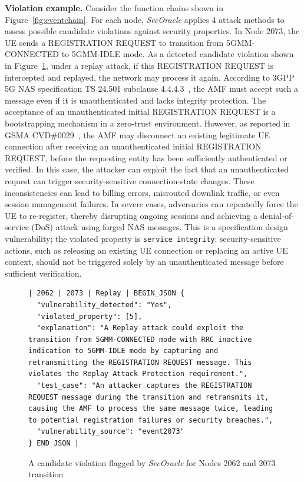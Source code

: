 \documentclass[sigconf]{acmart}
\begin{document}
{\noindent \textbf{Violation example.} Consider the function chains shown in Figure~\ref{fig:eventchain}. For each node, \textit{SecOracle} applies 4 attack methods to assess possible candidate violations against security properties. In Node 2073, the UE sends a REGISTRATION REQUEST to transition from 5GMM-CONNECTED to 5GMM-IDLE mode. As a detected candidate violation shown in Figure~\ref{fig:output_secoracle}, under a replay attack, if this REGISTRATION REQUEST is intercepted and replayed, the network may process it again. According to 3GPP 5G NAS specification TS 24.501 subclause 4.4.4.3~\cite{3GPP_TS_24501}, the AMF must accept such a message even if it is unauthenticated and lacks integrity protection. 
The acceptance of an unauthenticated initial REGISTRATION REQUEST is a bootstrapping mechanism in a zero-trust environment. However, as reported in GSMA CVD\#0029~\cite{hussain20195greasoner}, the AMF may disconnect an existing legitimate UE connection after receiving an unauthenticated initial REGISTRATION REQUEST, before the requesting entity has been sufficiently authenticated or verified. In this case, the attacker can exploit the fact that an unauthenticated request can trigger security-sensitive connection-state changes. These inconsistencies can lead to billing errors, misrouted downlink traffic, or even session management failures. In severe cases, adversaries can repeatedly force the UE to re-register, thereby disrupting ongoing sessions and achieving a denial-of-service (DoS) attack using forged NAS messages. This is a specification design vulnerability; the violated property is \texttt{service integrity}: security-sensitive actions, such as releasing an existing UE connection or replacing an active UE context, should not be triggered solely by an unauthenticated message before sufficient verification. 


\begin{figure}[t]
\centering
\begin{minipage}{0.98\columnwidth}
\begin{lstlisting}[style=myjsonblock]
| 2062 | 2073 | Replay | BEGIN_JSON {
  "vulnerability_detected": "Yes",
  "violated_property": [5],
  "explanation": "A Replay attack could exploit the transition from 5GMM-CONNECTED mode with RRC inactive indication to 5GMM-IDLE mode by capturing and retransmitting the REGISTRATION REQUEST message. This violates the Replay Attack Protection requirement.",
  "test_case": "An attacker captures the REGISTRATION REQUEST message during the transition and retransmits it, causing the AMF to process the same message twice, leading to potential registration failures or security breaches.",
  "vulnerability_source": "event2073"
} END_JSON |
\end{lstlisting}
\end{minipage}
\vspace{-0.1in}
\caption{A candidate violation flagged by \textit{SecOracle} for Nodes 2062 and 2073 transition}
\label{fig:output_secoracle}
\vspace{-0.1in}
\end{figure}


}
\end{document}
